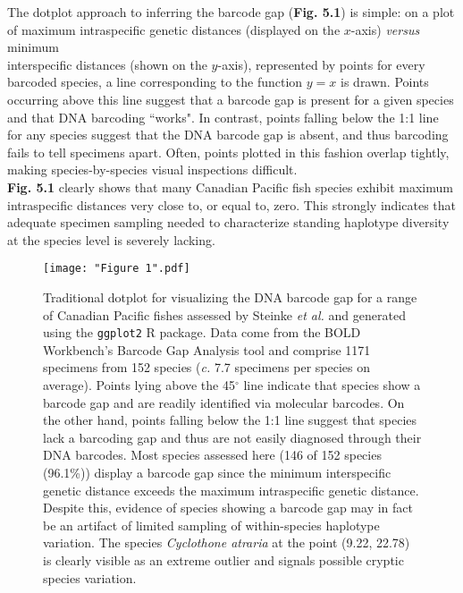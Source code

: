 The dotplot approach to inferring the barcode gap (\textbf{Fig. 5.1}) is simple: on a plot of maximum intraspecific genetic distances (displayed on the $x$-axis) \textit{versus} minimum \\ interspecific distances (shown on the $y$-axis), represented by points for every barcoded species, a line corresponding to the function $y=x$ is drawn. Points occurring above this line suggest that a barcode gap is present for a given species and that DNA barcoding ``works". In contrast, points falling below the 1:1 line for any species suggest that the DNA barcode gap is absent, and thus barcoding fails to tell specimens apart. Often, points plotted in this fashion overlap tightly, making species-by-species visual inspections difficult. \\ \textbf{Fig. 5.1} clearly shows that many Canadian Pacific fish species exhibit maximum 
\\ intraspecific distances very close to, or equal to, zero. This strongly indicates that adequate specimen sampling needed to characterize standing haplotype diversity at the species level is severely lacking.

\begin{figure}[H]

\centering

\texttt{[image: "Figure 1".pdf]}

\caption[Depiction of the DNA barcode gap as a traditional dotpot for Canadian Pacific fishes assessed by Steinke \textit{et al.} \cite{steinke2009dna}.]{Traditional dotplot for visualizing the DNA barcode gap for a range of Canadian Pacific fishes assessed by Steinke \textit{et al.} \cite{steinke2009dna} and generated using the {\tt ggplot2} \cite{wickham2016ggplot2} R package. Data come from the BOLD Workbench's Barcode Gap Analysis tool and comprise 1171 specimens from 152 species (\textit{c.} 7.7 specimens per species on average). Points lying above the 45$^{\circ}$ line indicate that species show a barcode gap and are readily identified via molecular barcodes. On the other hand, points falling below the 1:1 line suggest that species lack a barcoding gap and thus are not easily diagnosed through their DNA barcodes. Most species assessed here (146 of 152 species (96.1\%)) display a barcode gap since the minimum interspecific genetic distance exceeds the maximum intraspecific genetic distance. Despite this, evidence of species showing a barcode gap may in fact be an artifact of limited sampling of within-species haplotype variation. The species \textit{Cyclothone atraria} at the point (9.22, 22.78) is clearly visible as an extreme outlier and signals possible cryptic species variation.}
\end{figure}



